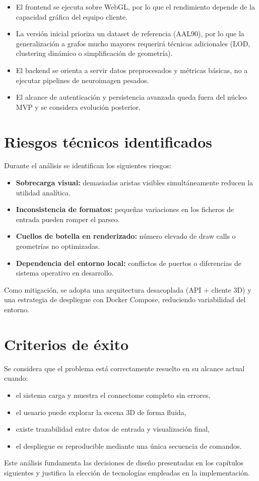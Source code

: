 \begin{itemize}
	\item El frontend se ejecuta sobre WebGL, por lo que el rendimiento depende de la capacidad gráfica del equipo cliente.
	\item La versión inicial prioriza un dataset de referencia (AAL90), por lo que la generalización a grafos mucho mayores requerirá técnicas adicionales (LOD, clustering dinámico o simplificación de geometría).
	\item El backend se orienta a servir datos preprocesados y métricas básicas, no a ejecutar pipelines de neuroimagen pesados.
	\item El alcance de autenticación y persistencia avanzada queda fuera del núcleo MVP y se considera evolución posterior.
\end{itemize}

\section{Riesgos técnicos identificados}

Durante el análisis se identifican los siguientes riesgos:

\begin{itemize}
	\item \textbf{Sobrecarga visual:} demasiadas aristas visibles simultáneamente reducen la utilidad analítica.
	\item \textbf{Inconsistencia de formatos:} pequeñas variaciones en los ficheros de entrada pueden romper el parseo.
	\item \textbf{Cuellos de botella en renderizado:} número elevado de draw calls o geometrías no optimizadas.
	\item \textbf{Dependencia del entorno local:} conflictos de puertos o diferencias de sistema operativo en desarrollo.
\end{itemize}

Como mitigación, se adopta una arquitectura desacoplada (API + cliente 3D) y una estrategia de despliegue con Docker Compose, reduciendo variabilidad del entorno.

\section{Criterios de éxito}

Se considera que el problema está correctamente resuelto en su alcance actual cuando:

\begin{itemize}
	\item el sistema carga y muestra el connectome completo sin errores,
	\item el usuario puede explorar la escena 3D de forma fluida,
	\item existe trazabilidad entre datos de entrada y visualización final,
	\item el despliegue es reproducible mediante una única secuencia de comandos.
\end{itemize}

Este análisis fundamenta las decisiones de diseño presentadas en los capítulos siguientes y justifica la elección de tecnologías empleadas en la implementación.
 
